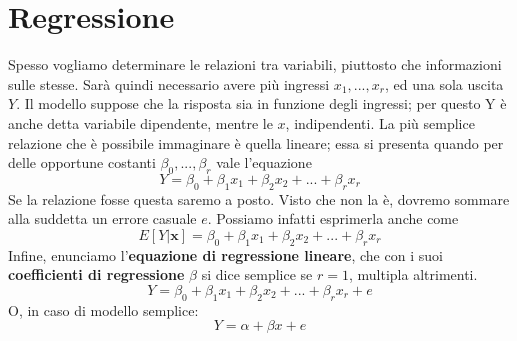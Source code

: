 \documentclass[11pt]{article}
\begin{document}
\section{Regressione}
Spesso vogliamo determinare le relazioni tra variabili, piuttosto che informazioni sulle stesse. Sarà quindi necessario avere più ingressi $x_1,...,x_r$, ed una sola uscita $Y$. Il modello suppose che la risposta sia in funzione degli ingressi; per questo Y è anche detta variabile dipendente, mentre le $x$, indipendenti. La più semplice relazione che è possibile immaginare è quella lineare; essa si presenta quando per delle opportune costanti $\beta_0,...,\beta_r$ vale l'equazione
\begin{displaymath}
    Y=\beta_0+\beta_1 x_1+\beta_2x_2+...+\beta_rx_r
\end{displaymath}
Se la relazione fosse questa saremo a posto. Visto che non la è, dovremo sommare alla suddetta un errore casuale $e$. Possiamo infatti esprimerla anche come 
\begin{displaymath}
    E[Y|\textbf{x}]=\beta_0+\beta_1 x_1+\beta_2x_2+...+\beta_rx_r
\end{displaymath}
Infine, enunciamo l'\textbf{equazione di regressione lineare}, che con i suoi \textbf{coefficienti di regressione} $\beta$ si dice semplice se $r=1$, multipla altrimenti.
\begin{displaymath}
    Y=\beta_0+\beta_1 x_1+\beta_2x_2+...+\beta_rx_r+e
\end{displaymath}
O, in caso di modello semplice:
\begin{displaymath}
    Y=\alpha+\beta x+e
\end{displaymath}
\end{document}
